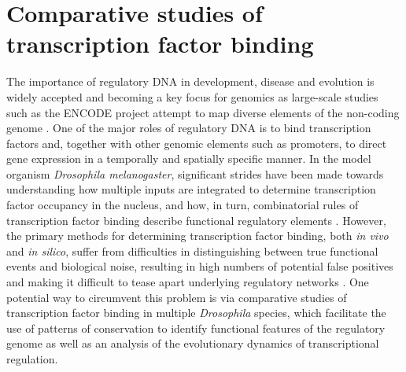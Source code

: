 \section{Comparative studies of transcription factor binding}
The importance of regulatory DNA in development, disease and evolution is widely accepted and becoming a key focus for genomics as large-scale studies such as the ENCODE project attempt to map diverse elements of the non-coding genome \citep{dunham_integrated_2012,gordon_tempo_2012,neph_expansive_2012,wray_evolutionary_2007}. One of the major roles of regulatory DNA is to bind transcription factors and, together with other genomic elements such as promoters, to direct gene expression in a temporally and spatially specific manner. In the model organism \emph{Drosophila melanogaster}, significant strides have been made towards understanding how multiple inputs are integrated to determine transcription factor occupancy in the nucleus, and how, in turn, combinatorial rules of transcription factor binding describe functional regulatory elements \citep{kaplan_quantitative_2011,li_role_2011,zinzen_combinatorial_2009}. However, the primary methods for determining transcription factor binding, both \emph{in vivo} and \emph{in silico}, suffer from difficulties in distinguishing between true functional events and biological noise, resulting in high numbers of potential false positives and making it difficult to tease apart underlying regulatory networks \citep{biggin_animal_2011,fisher_dna_2012,macarthur_developmental_2009}. One potential way to circumvent this problem is via comparative studies of transcription factor binding in multiple \emph{Drosophila} species, which facilitate the use of patterns of conservation to identify functional features of the regulatory genome as well as an analysis of the evolutionary dynamics of transcriptional regulation.\\

